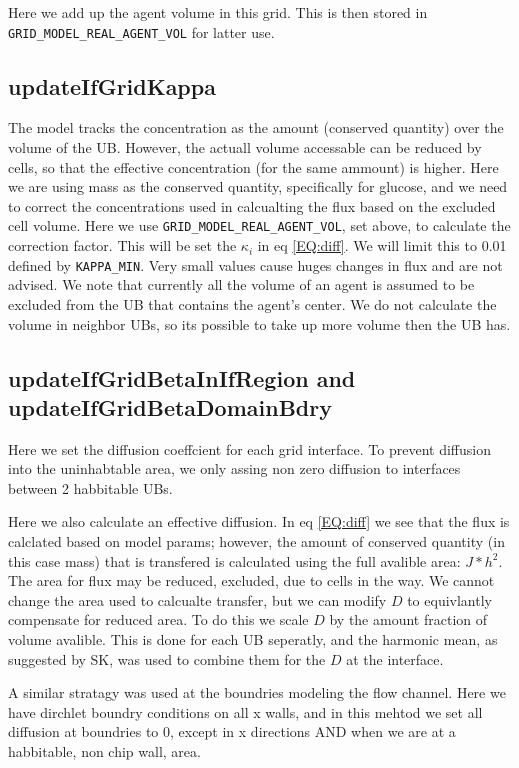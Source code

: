 \documentclass{article}
\begin{document}
Here we add up the agent volume in this grid.
This is then stored in \texttt{GRID\_MODEL\_REAL\_AGENT\_VOL} for latter use.

\subsection{updateIfGridKappa}


The model tracks the concentration as the amount (conserved quantity) over the volume of the UB.
However, the actuall volume accessable can be reduced by cells, 
so that the effective concentration (for the same ammount) is higher.
Here we are using mass as the conserved quantity, specifically for glucose,
and we need to correct the concentrations used in calcualting the flux based on the excluded cell volume.
Here we use \texttt{GRID\_MODEL\_REAL\_AGENT\_VOL}, set above, 
to calculate the correction factor.
This will be set the $\kappa_i$ in eq \ref{EQ:diff}.
We will limit this to 0.01 defined by \texttt{KAPPA\_MIN}.
Very small values cause huges changes in flux and are not advised.
We note that currently all the volume of an agent is assumed to be excluded from the UB that contains the agent's center.
We do not calculate the volume in neighbor UBs, so its possible to take up more volume then the UB has.

\subsection{updateIfGridBetaInIfRegion and updateIfGridBetaDomainBdry}
Here we set the diffusion coeffcient for each grid interface.
To prevent diffusion into the uninhabtable area, 
we only assing non zero diffusion to interfaces between 2 habbitable UBs.

Here we also calculate an effective diffusion.
In eq \ref{EQ:diff} we see that the flux is calclated based on model params;
however, the amount of conserved quantity (in this case mass) that is transfered is calculated using the full avalible area: $J*h^2$.
The area for flux may be reduced, excluded, due to cells in the way.
We cannot change the area used to calcualte transfer,
but we can modify $D$ to equivlantly compensate for reduced area.
To do this we scale $D$ by the amount fraction of volume avalible.
This is done for each UB seperatly, and the harmonic mean,
as suggested by SK, was used to combine them for the $D$ at the interface.

A similar stratagy was used at the boundries modeling the flow channel.
Here we have dirchlet boundry conditions on all x walls,
and in this mehtod we set all diffusion at boundries to 0, except 
in x directions AND when we are at a habbitable, non chip wall, area.
 
\end{document}
